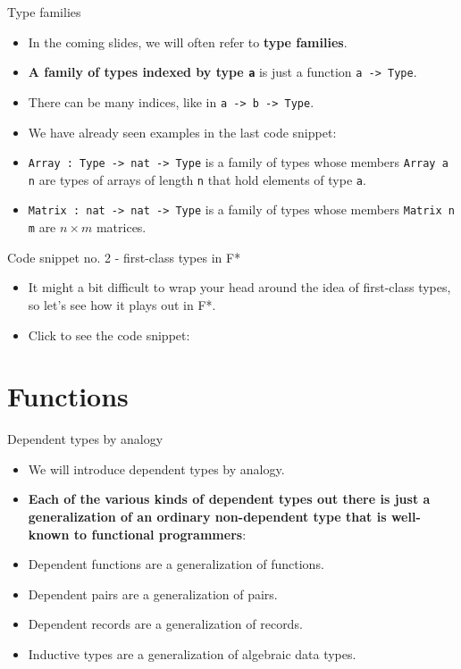 \documentclass{beamer}
\newcommand{\m}[1]{\texttt{#1}}
\begin{document}
\begin{frame}{Type families}
\begin{itemize}
	\item In the coming slides, we will often refer to \textbf{type families}.
	\item \textbf{A family of types indexed by type \m{a}} is just a function \m{a -> Type}.
	\item There can be many indices, like in \m{a -> b -> Type}.
	\item We have already seen examples in the last code snippet:
	\item \m{Array :\ Type -> nat -> Type} is a family of types whose members \m{Array a n} are types of arrays of length \m{n} that hold elements of type \m{a}.
	\item \m{Matrix :\ nat -> nat -> Type} is a family of types whose members \m{Matrix n m} are $n \times m$ matrices.
\end{itemize}
\end{frame}

\begin{frame}{Code snippet no. 2 - first-class types in F*}
\begin{itemize}
	\item It might a bit difficult to wrap your head around the idea of first-class types, so let's see how it plays out in F*.
	\item Click to see the code snippet: \href{https://github.com/wkolowski/Dependent-Types-and-Theorem-Proving/blob/master/Code/Universe.fst}{\color{blue}{Code/Universe.fst}}
\end{itemize}
\end{frame}

\section{Functions}

\begin{frame}{Dependent types by analogy}
\begin{itemize}
	\item We will introduce dependent types by analogy.
	\item \textbf{Each of the various kinds of dependent types out there is just a generalization of an ordinary non-dependent type that is well-known to functional programmers}:
	\item Dependent functions are a generalization of functions.
	\item Dependent pairs are a generalization of pairs.
	\item Dependent records are a generalization of records.
	\item Inductive types are a generalization of algebraic data types.
\end{itemize}
\end{frame}
\end{document}
